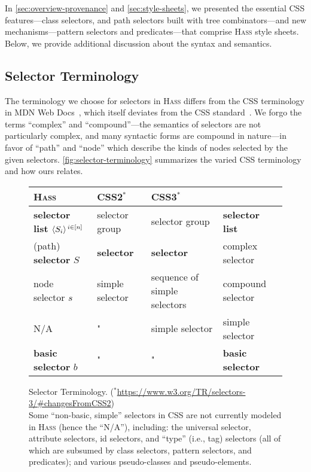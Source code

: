 \documentclass[acmsmall, screen]{acmart}
\newcommand{\hass}
{\textsc{Hass}}
\newcommand{\varBasicSelector}{b} \newcommand{\varNodeSelector}{s}
\newcommand{\varPathSelector}{S}
\newcommand{\smallSep}
  {\hspace{0.02in}}
\newcommand{\rangeN}[3]
{\langle#3\rangle\smallSep^{#1 \in [#2]}}
\begin{document}
\setlength\fboxsep{2pt}

In \autoref{sec:overview-provenance} and \autoref{sec:style-sheets}, we presented the essential CSS features---class selectors, and path selectors built with tree combinators---and new mechanisms---pattern selectors and predicates---that comprise \hass{} style sheets.
Below, we provide additional discussion about the syntax and semantics.


\subsection{Selector Terminology}
\label{sec:selector-terminology}

The terminology we choose for selectors in \hass{} differs from the CSS terminology in MDN Web Docs~\cite{mdnDocs}, which itself deviates from the CSS standard~\cite{css}.
We forgo the terms ``complex'' and ``compound''---the semantics of selectors are not particularly complex, and many syntactic forms are compound in nature---in favor of ``path'' and ``node'' which describe the kinds of nodes selected by the given selectors.
\autoref{fig:selector-terminology} summarizes the varied CSS terminology and how ours relates.

\begin{figure}[h]
\centering
\newcommand{\theWinnerIs}[1]
  {\textbf{#1}}
\begin{tabular}{l|lll}
\hass{} &
CSS2$^*$ &
CSS3$^*$ &
\citet{mdnDocs} \\
\hline
\theWinnerIs{selector list} $\rangeN{i}{n}{\varPathSelector_i}$ & selector group  & selector group & \theWinnerIs{selector list} \\
(path) \theWinnerIs{selector} $\varPathSelector$ & \theWinnerIs{selector} & \theWinnerIs{selector} & complex selector \\
{node selector} $\varNodeSelector$ & simple selector & sequence of simple selectors & compound selector \\
N/A & " & simple selector & simple selector \\
\theWinnerIs{basic selector} $\varBasicSelector$ & " & " & \theWinnerIs{basic selector} \\
\end{tabular}
\caption{Selector Terminology.
($^*$\url{https://www.w3.org/TR/selectors-3/\#changesFromCSS2}) \\
Some ``non-basic, simple'' selectors in CSS are not currently modeled in \hass{} (hence the ``N/A''), including:
the universal selector, attribute selectors, id selectors, and ``type'' (i.e., tag) selectors (all of which are subsumed by class selectors, pattern selectors, and predicates); and
various pseudo-classes and pseudo-elements.
}
\label{fig:selector-terminology}
\end{figure}
 
\end{document}
